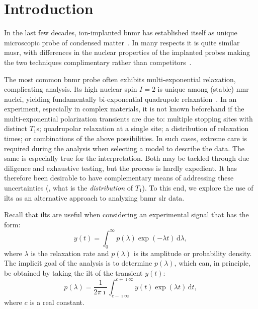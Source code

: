 \section{Introduction \label{sec:introduction}}

In the last few decades, ion-implanted \gls{bnmr} has established itself as unique microscopic probe of condensed matter~\cite{2015-MacFarlane-SSNMR-68-1}.
In many respects it is quite similar \gls{musr}, with differences in the nuclear properties of the implanted probes making the two techniques complimentary rather than competitors~\cite{2000-Kiefl-PB-289-640}.

The most common \gls{bnmr} probe  often exhibits multi-exponential relaxation, complicating analysis.
Its high nuclear spin $I = 2$ is unique among (stable) \gls{nmr} nuclei, yielding fundamentally bi-exponential quadrupole relaxation~\cite{1970-Hubbard-JCP-53-985, 1982-Becker-ZNA-37-697, 1985-Korblein-JPFMP-15-561}.
In an experiment, especially in complex materials, it is not known beforehand if the multi-exponential polarization transients are due to:
multiple  stopping sites with distinct $T_{1}$s;
quadrupolar relaxation at a single site;
a distribution of relaxation times;
or combinations of the above possibilities.
In such cases, extreme care is required during the analysis when selecting a model to describe the data.
The same is especially true for the interpretation.
Both may be tackled through due diligence and exhaustive testing, but the process is hardly expedient.
It has therefore been desirable to have complementary means of addressing these uncertainties (, what is the \emph{distribution} of $T_{1}$).
To this end, we explore the use of \glspl{ilt} as an alternative approach to analyzing  \gls{bnmr} \gls{slr} data.

Recall that \glspl{ilt} are useful when considering an experimental signal that has the form:
\begin{equation}
\label{eq:signal-integral}
   y(t) = \int_{0}^{\infty} p(\lambda) \exp ( - \lambda t) \, \mathrm{d} \lambda,
\end{equation}
where $\lambda$ is the relaxation rate and $p ( \lambda )$ is its amplitude or probability density.
The implicit goal of the analysis is to determine $p ( \lambda )$, which can, in principle, be obtained by taking the \gls{ilt} of the transient $y(t)$:
\begin{equation}
\label{eq:ilt}
   p ( \lambda ) = \frac{1}{2 \pi \imath} \int_{c - \imath \infty}^{c + \imath \infty} y(t) \exp ( \lambda t ) \, \mathrm{d} t ,
\end{equation}
where $c$ is a real constant.

